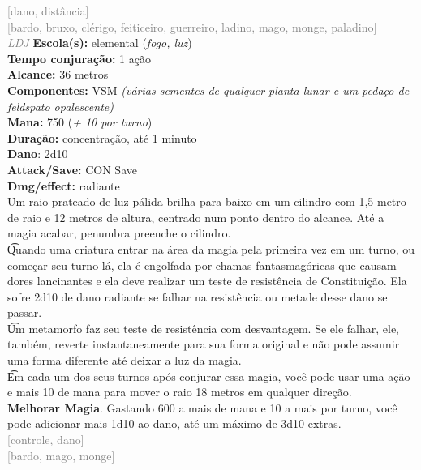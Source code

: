 \documentclass{RPG_Adventure}[2021/10/20]
\begin{document}
{\scriptsize \textcolor{gray}{[dano, distância]\\}}
{\scriptsize \textcolor{gray}{[bardo, bruxo, clérigo, feiticeiro, guerreiro, ladino, mago, monge, paladino]\\}}
{\tiny \textcolor{gray}{\textit{LDJ}}}
{\small \t \textbf{Escola(s):} elemental (\textit{fogo, luz})\\\t \textbf{Tempo conjuração:} 1 ação\\\t \textbf{Alcance:} 36 metros\\\t \textbf{Componentes:} VSM \textit{(várias sementes de qualquer planta lunar e um pedaço de feldspato opalescente)}\\\t \textbf{Mana:} 750 (\textit{+ 10 por turno})\\\t \textbf{Duração:} concentração, até 1 minuto\\\t \textbf{Dano}: 2d10\\\t \textbf{Attack/Save:} CON Save\\\t \textbf{Dmg/effect:} radiante\\}
{\normalsize Um raio prateado de luz pálida brilha para baixo em um cilindro com 1,5 metro de raio e 12 metros de altura, centrado num ponto dentro do alcance. Até a magia acabar, penumbra preenche o cilindro.\\\t Quando uma criatura entrar na área da magia pela primeira vez em um turno, ou começar seu turno lá, ela é engolfada por chamas fantasmagóricas que causam dores lancinantes e ela deve realizar um teste de resistência de Constituição. Ela sofre 2d10 de dano radiante se falhar na resistência ou metade desse dano se passar.\\\t Um metamorfo faz seu teste de resistência com desvantagem. Se ele falhar, ele, também, reverte instantaneamente para sua forma original e não pode assumir uma forma diferente até deixar a luz da magia.\\\t Em cada um dos seus turnos após conjurar essa magia, você pode usar uma ação e mais 10 de mana para mover o raio 18 metros em qualquer direção.\\\t \textbf{Melhorar Magia}. Gastando 600 a mais de mana e 10 a mais por turno, você pode adicionar mais 1d10 ao dano, até um máximo de 3d10 extras.\\}
{\scriptsize \textcolor{gray}{[controle, dano]\\}}
{\scriptsize \textcolor{gray}{[bardo, mago, monge]\\}}
\end{document}

